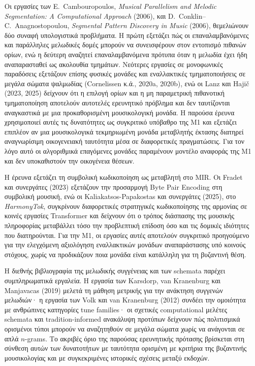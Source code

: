 \documentclass[11pt,a4paper]{article}
\begin{document}
Οι εργασίες των E.~Cambouropoulos, \emph{Musical Parallelism and Melodic Segmentation: A Computational Approach} (2006), και D.~Conklin--C.~Anagnostopoulou, \emph{Segmental Pattern Discovery in Music} (2006), θεμελιώνουν δύο συναφή υπολογιστικά προβλήματα. Η πρώτη εξετάζει πώς οι επαναλαμβανόμενες και παράλληλες μελωδικές δομές μπορούν να συνεισφέρουν στον εντοπισμό πιθανών ορίων, ενώ η δεύτερη αναζητεί επαναλαμβανόμενα πρότυπα όταν η μελωδία έχει ήδη αναπαρασταθεί ως ακολουθία τμημάτων. Νεότερες εργασίες σε μονοφωνικές παραδόσεις εξετάζουν επίσης φυσικές μονάδες και εναλλακτικές τμηματοποιήσεις σε μεγάλα σώματα ψαλμωδίας (Cornelissen κ.ά., 2020a, 2020b), ενώ οι Lanz και Hajič (2023, 2025) δείχνουν ότι η επιλογή ορίων και η μη παραμετρική πιθανοτική τμηματοποίηση αποτελούν αυτοτελές ερευνητικό πρόβλημα και δεν ταυτίζονται αναγκαστικά με μια προκαθορισμένη μουσικολογική μονάδα. Η παρούσα έρευνα χρησιμοποιεί αυτές τις δυνατότητες ως συγκριτικό υπόβαθρο της M1 και εξετάζει επιπλέον αν μια μουσικολογικά τεκμηριωμένη μονάδα μεταβλητής έκτασης διατηρεί αναγνωρίσιμη οικογενειακή ταυτότητα μέσα σε διαφορετικές πραγματώσεις. Για τον λόγο αυτό οι αλγοριθμικά επαγόμενες μονάδες παραμένουν μοντέλο αναφοράς της M1 και δεν υποκαθιστούν την οικογένεια θέσεων.

Η έρευνα εξετάζει τη συμβολική κωδικοποίηση ως μεταβλητή στο MIR. Οι Fradet και συνεργάτες (2023) εξετάζουν την προσαρμογή Byte Pair Encoding στη συμβολική μουσική, ενώ οι Kaliakatsos-Papakostas και συνεργάτες (2025), στο \emph{HarmonyTok}, συγκρίνουν διαφορετικές στρατηγικές κωδικοποίησης της αρμονίας σε κοινές εργασίες Transformer και δείχνουν ότι ο τρόπος διάσπασης της μουσικής πληροφορίας μεταβάλλει τόσο την προβλεπτική επίδοση όσο και τις δομικές ιδιότητες που διατηρούνται. Για την M1, οι εργασίες αυτές αποτελούν συγκριτικό προηγούμενο για την ελεγχόμενη αξιολόγηση εναλλακτικών μονάδων αναπαράστασης υπό κοινούς στόχους, χωρίς να προδικάζουν ποια μονάδα είναι κατάλληλη για τη βυζαντινή θέση.

Η διεθνής βιβλιογραφία της μελωδικής συγγένειας και των schemata παρέχει συμπληρωματικά εργαλεία. Η εργασία των Karsdorp, van Kranenburg και Manjavacas (2019) μελετά τη μάθηση μετρικής για την ανάκτηση συγγενών μελωδιών· η εργασία των Volk και van Kranenburg (2012) συνδέει την ομοιότητα με ανθρώπινες κατηγορίες tune families· οι σχετικές computational μελέτες schemata και tradition-informed ανακάλυψη προτύπων δείχνουν πώς πολιτισμικά ορισμένοι τύποι μπορούν να αναζητηθούν σε μεγάλα σώματα χωρίς να ανάγονται σε απλά $n$-grams. Το ακριβές όριο της παρούσας ερευνητικής πρότασης βρίσκεται στη σύνθεση αυτών των δυνατοτήτων με ταυτότητα ορισμένη με κριτήρια της βυζαντινής μουσικολογίας και με συγκεκριμένες ιστορικές σχέσεις μεταξύ εκδοχών.
\end{document}
